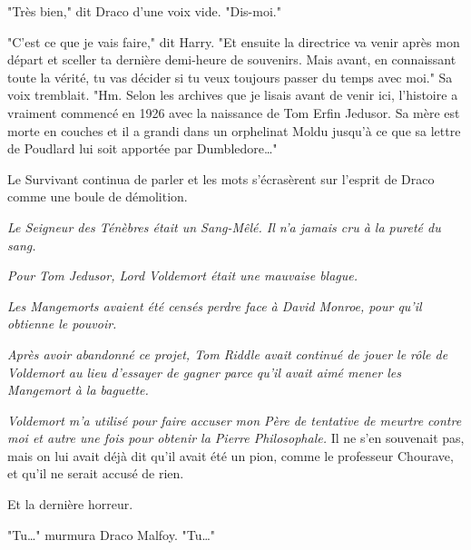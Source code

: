 "Très bien," dit Draco d'une voix vide. "Dis-moi."

"C'est ce que je vais faire," dit Harry. "Et ensuite la directrice va venir après mon départ et sceller ta dernière demi-heure de souvenirs. Mais avant, en connaissant toute la vérité, tu vas décider si tu veux toujours passer du temps avec moi." Sa voix tremblait. "Hm. Selon les archives que je lisais avant de venir ici, l'histoire a vraiment commencé en 1926 avec la naissance de Tom Erfin Jedusor. Sa mère est morte en couches et il a grandi dans un orphelinat Moldu jusqu'à ce que sa lettre de Poudlard lui soit apportée par Dumbledore…"

Le Survivant continua de parler et les mots s'écrasèrent sur l'esprit de Draco comme une boule de démolition.

\emph{Le Seigneur des Ténèbres était un Sang-Mêlé. Il n'a jamais cru à la pureté du sang.} 

\emph{Pour Tom Jedusor, Lord Voldemort était une mauvaise blague.} 

\emph{Les Mangemorts avaient été censés perdre face à David Monroe, pour qu'il obtienne le pouvoir.} 

\emph{Après avoir abandonné ce projet, Tom Riddle avait continué de jouer le rôle de Voldemort au lieu d'essayer de gagner parce qu'il avait aimé mener les Mangemort à la baguette.} 

\emph{Voldemort m'a utilisé pour faire accuser mon Père de tentative de meurtre contre moi et autre une fois pour obtenir la Pierre Philosophale.}  Il ne s'en souvenait pas, mais on lui avait déjà dit qu'il avait été un pion, comme le professeur Chourave, et qu'il ne serait accusé de rien.

Et la dernière horreur.

"Tu…" murmura Draco Malfoy. "Tu…"

